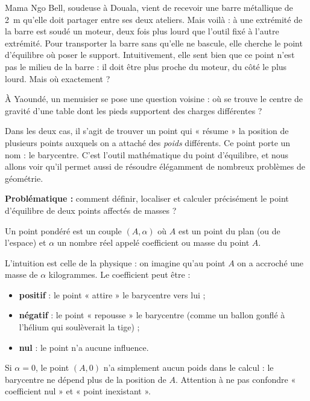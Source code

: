 \documentclass[11pt]{article}
\newcommand{\cle}[1]{{\popxbold\color{popdark}#1}}
\newcounter{popsec}
\newcounter{popsub}
\newcommand{\courssub}[1]{%
  \stepcounter{popsub}%
  \par\vspace{9pt}\noindent{\popxbold\fontsize{11.5}{13}\selectfont\color{popink}{\color{poporange}\thepopsec.\thepopsub}\hspace{6pt}#1}\par\nopagebreak\vspace{4pt}
}
\begin{document}
Mama Ngo Bell, soudeuse à Douala, vient de recevoir une barre métallique de \SI{2}{m} qu'elle doit partager entre ses deux ateliers. Mais voilà : à une extrémité de la barre est soudé un moteur, deux fois plus lourd que l'outil fixé à l'autre extrémité. Pour transporter la barre sans qu'elle ne bascule, elle cherche le \cle{point d'équilibre} où poser le support. Intuitivement, elle sent bien que ce point n'est pas le milieu de la barre : il doit être plus proche du moteur, du côté le plus lourd. Mais où exactement ?

À Yaoundé, un menuisier se pose une question voisine : où se trouve le centre de gravité d'une table dont les pieds supportent des charges différentes ?

Dans les deux cas, il s'agit de trouver un point qui « résume » la position de plusieurs points auxquels on a attaché des \emph{poids} différents. Ce point porte un nom : le \cle{barycentre}. C'est l'outil mathématique du point d'équilibre, et nous allons voir qu'il permet aussi de résoudre élégamment de nombreux problèmes de géométrie.

\textbf{Problématique :} comment définir, localiser et calculer précisément le point d'équilibre de deux points affectés de masses ?

\courssub{Notion de point pondéré}

\begin{definition}
Un \cle{point pondéré} est un couple $(A, \alpha)$ où $A$ est un point du plan (ou de l'espace) et $\alpha$ un nombre réel appelé \cle{coefficient} ou \cle{masse} du point $A$.
\end{definition}

L'intuition est celle de la physique : on imagine qu'au point $A$ on a accroché une masse de $\alpha$ kilogrammes. Le coefficient peut être :
\begin{itemize}
\item \textbf{positif} : le point « attire » le barycentre vers lui ;
\item \textbf{négatif} : le point « repousse » le barycentre (comme un ballon gonflé à l'hélium qui soulèverait la tige) ;
\item \textbf{nul} : le point n'a aucune influence.
\end{itemize}

\begin{attention}
Si $\alpha = 0$, le point $(A, 0)$ n'a simplement aucun poids dans le calcul : le barycentre ne dépend plus de la position de $A$. Attention à ne pas confondre « coefficient nul » et « point inexistant ».
\end{attention}
\end{document}
